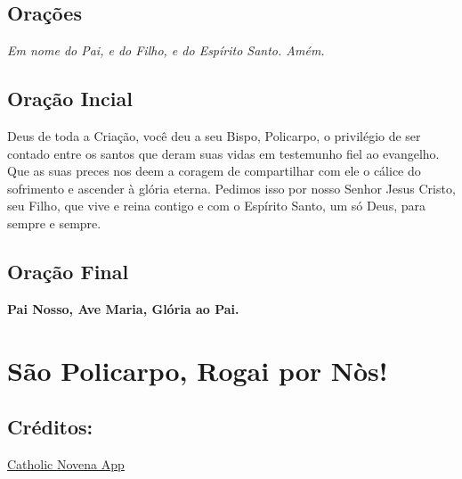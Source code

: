 \documentclass[a4paper,14pt]{extarticle} \usepackage[utf8]{inputenc}
\begin{document}
\begin{justify}
\newpage
\begin{center}
 \section{Orações}\label{sec:Orações} %
\textit{Em nome do Pai, e do Filho, e do Espírito Santo. Amém.}
\end{center}

\subsection{Oração Incial}\label{sec:Oração_Inicial} %



Deus de toda a Criação, você deu a seu Bispo, Policarpo, o privilégio de ser contado entre os santos que deram suas vidas em testemunho fiel ao evangelho. Que as suas preces nos deem a coragem de compartilhar com ele o cálice do sofrimento e ascender à glória eterna. Pedimos isso por nosso Senhor Jesus Cristo, seu Filho, que vive e reina contigo e com o Espírito Santo, um só Deus, para sempre e sempre.

\subsection{Oração Final}\label{sec:Oração_Final} %
\begin{center}
\textbf{Pai Nosso, Ave Maria, Glória ao Pai.}

\vfill
\section*{São Policarpo, Rogai por Nòs!}

\vfill
\subsection*{Créditos:}
\href{https://catholicnovenaapp.com/novenas/st-margaret-of-cortona-novena/#day-1-prayer}{Catholic Novena App}

\end{center}


\end{justify}
\end{document}
